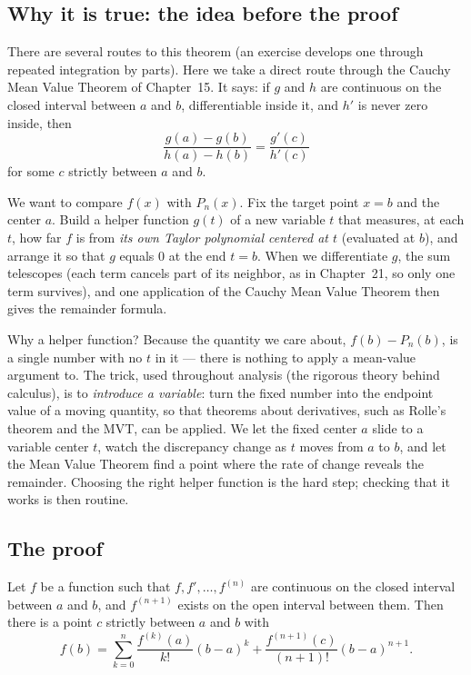 \subsection{Why it is true: the idea before the proof}

There are several routes to this theorem (an exercise develops one through repeated
integration by parts). Here we take a direct route through the Cauchy Mean Value
Theorem of Chapter~15. It says: if $g$ and $h$ are continuous on the closed interval
between $a$ and $b$, differentiable inside it, and $h'$ is never zero inside, then
\[
  \frac{g(a) - g(b)}{h(a) - h(b)} = \frac{g'(c)}{h'(c)}
\]
for some $c$ strictly between $a$ and $b$.

We want to compare $f(x)$ with $P_n(x)$. Fix the target point $x = b$ and the center
$a$. Build a helper function $g(t)$ of a new variable $t$ that measures, at each $t$,
how far $f$ is from \emph{its own Taylor polynomial centered at $t$} (evaluated at
$b$), and arrange it so that $g$ equals $0$ at the end $t=b$. When we differentiate
$g$, the sum telescopes (each term cancels part of its neighbor, as in Chapter~21, so
only one term survives), and one application of the Cauchy Mean Value Theorem then
gives the remainder formula.

\begin{whybox}
Why a helper function? Because the quantity we care about, $f(b) - P_n(b)$, is a
single number with no $t$ in it --- there is nothing to apply a mean-value argument
to. The trick, used throughout analysis (the rigorous theory behind calculus), is to
\emph{introduce a variable}: turn the fixed number into the endpoint value of a
moving quantity, so that theorems about derivatives, such as Rolle's theorem and the
MVT, can be applied. We let the fixed center $a$ slide to a variable center $t$,
watch the discrepancy change as $t$ moves from $a$ to $b$, and let the Mean Value
Theorem find a point where the rate of change reveals the remainder. Choosing the
right helper function is the hard step; checking that it works is then routine.
\end{whybox}

\subsection{The proof}

\begin{theorem}
\label{ch31:thm-taylor}
Let $f$ be a function such that $f, f', \dots, f^{(n)}$ are continuous on the closed
interval between $a$ and $b$, and $f^{(n+1)}$ exists on the open interval between
them. Then there is a point $c$ strictly between $a$ and $b$ with
\[
  f(b) = \sum_{k=0}^{n} \frac{f^{(k)}(a)}{k!}(b-a)^k
       + \frac{f^{(n+1)}(c)}{(n+1)!}(b-a)^{n+1}.
\]
\end{theorem}

